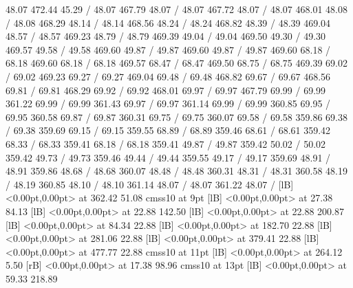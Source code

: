 \documentclass[12pt,a4paper]{report}
\begin{document}
{\setsolid
{} 48.07 472.44 45.29 /
\setsolid
{} 48.07 467.79 48.07 /
 48.07 467.72 48.07 /
 48.07 468.01 48.08 /
 48.08 468.29 48.14 /
 48.14 468.56 48.24 /
 48.24 468.82 48.39 /
 48.39 469.04 48.57 /
 48.57 469.23 48.79 /
 48.79 469.39 49.04 /
 49.04 469.50 49.30 /
 49.30 469.57 49.58 /
 49.58 469.60 49.87 /
 49.87 469.60 49.87 /
 49.87 469.60 68.18 /
 68.18 469.60 68.18 /
 68.18 469.57 68.47 /
 68.47 469.50 68.75 /
 68.75 469.39 69.02 /
 69.02 469.23 69.27 /
 69.27 469.04 69.48 /
 69.48 468.82 69.67 /
 69.67 468.56 69.81 /
 69.81 468.29 69.92 /
 69.92 468.01 69.97 /
 69.97 467.79 69.99 /
 69.99 361.22 69.99 /
 69.99 361.43 69.97 /
 69.97 361.14 69.99 /
 69.99 360.85 69.95 /
 69.95 360.58 69.87 /
 69.87 360.31 69.75 /
 69.75 360.07 69.58 /
 69.58 359.86 69.38 /
 69.38 359.69 69.15 /
 69.15 359.55 68.89 /
 68.89 359.46 68.61 /
 68.61 359.42 68.33 /
 68.33 359.41 68.18 /
 68.18 359.41 49.87 /
 49.87 359.42 50.02 /
 50.02 359.42 49.73 /
 49.73 359.46 49.44 /
 49.44 359.55 49.17 /
 49.17 359.69 48.91 /
 48.91 359.86 48.68 /
 48.68 360.07 48.48 /
 48.48 360.31 48.31 /
 48.31 360.58 48.19 /
 48.19 360.85 48.10 /
 48.10 361.14 48.07 /
 48.07 361.22 48.07 /
  [lB] <0.00pt,0.00pt> at 362.42 51.08
\font\picfont cmss10 at 9pt\picfont
{}  [lB] <0.00pt,0.00pt> at 27.38 84.13
  [lB] <0.00pt,0.00pt> at 22.88 142.50
  [lB] <0.00pt,0.00pt> at 22.88 200.87
  [lB] <0.00pt,0.00pt> at 84.34 22.88
  [lB] <0.00pt,0.00pt> at 182.70 22.88
  [lB] <0.00pt,0.00pt> at 281.06 22.88
  [lB] <0.00pt,0.00pt> at 379.41 22.88
  [lB] <0.00pt,0.00pt> at 477.77 22.88
\font\picfont cmss10 at 11pt\picfont
{}  [lB] <0.00pt,0.00pt> at 264.12 5.50
 [rB] <0.00pt,0.00pt> at 17.38 98.96
\font\picfont cmss10 at 13pt\picfont
{}  [lB] <0.00pt,0.00pt> at 59.33 218.89
\endpicture
}
\end{document}
